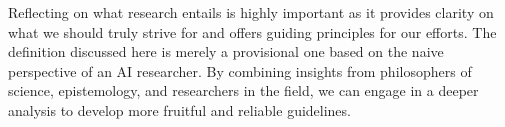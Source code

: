 \documentclass{book}
\begin{document}
Reflecting on what research entails is highly important as it provides clarity on what we should truly strive for and offers guiding principles for our efforts. The definition discussed here is merely a provisional one based on the naive perspective of an AI researcher. By combining insights from philosophers of science, epistemology, and researchers in the field, we can engage in a deeper analysis to develop more fruitful and reliable guidelines.



\end{document}
